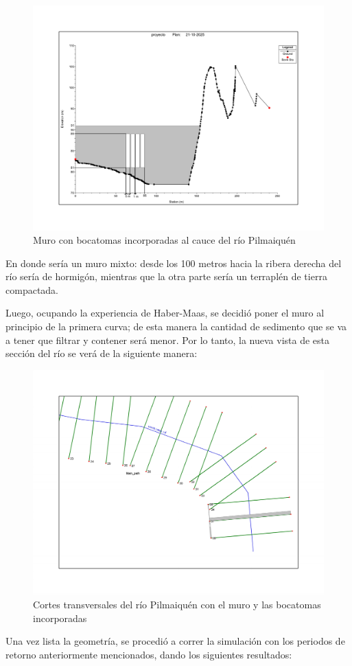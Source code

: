 \documentclass{article} %
\begin{document}
\begin{figure}[H]
    \centering
    \includegraphics[width=0.8\linewidth]{imagenes/muro.pdf}
    \caption{Muro con bocatomas incorporadas al cauce del río Pilmaiquén}
\end{figure}

En donde sería un muro mixto: desde los 100 metros hacia la ribera derecha del río sería de hormigón, mientras que la otra parte sería un terraplén de tierra compactada.

Luego, ocupando la experiencia de Haber-Maas, se decidió poner el muro al principio de la primera curva; de esta manera la cantidad de sedimento que se va a tener que filtrar y contener será menor. Por lo tanto, la nueva vista de esta sección del río se verá de la siguiente manera:

\begin{figure}[H]
    \centering
    \includegraphics[width=0.6\linewidth]{imagenes/rio.pdf}
    \caption{Cortes transversales del río Pilmaiquén con el muro y las bocatomas incorporadas}
\end{figure}

Una vez lista la geometría, se procedió a correr la simulación con los periodos de retorno anteriormente mencionados, dando los siguientes resultados:
\end{document}
